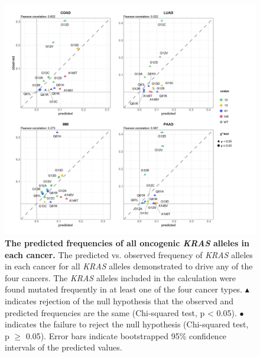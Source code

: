 \documentclass[english, 10pt, letterpaper]{article}
\newcommand{\KRAS}{\emph{KRAS}}
\begin{document}
\begin{figure}[h!]
\centering
\includegraphics[width=180mm]{figures/Supp_Fig_2_mod.jpg}
\caption{
    \textbf{The predicted frequencies of all oncogenic \KRAS{} alleles in each cancer.}
    The predicted vs. observed frequency of \KRAS{} alleles in each cancer for all \KRAS{} alleles demonstrated to drive any of the four cancers. The \KRAS{} alleles included in the calculation were found mutated frequently in at least one of the four cancer types. $\blacktriangle$ indicates rejection of the null hypothesis that the observed and predicted frequencies are the same (Chi-squared test, p < 0.05). $\bullet$ indicates the failure to reject the null hypothesis (Chi-squared test, p $\ge$ 0.05). Error bars indicate bootstrapped 95\% confidence intervals of the predicted values.
}
\label{sfig:obs-vs-pred-supp}
\end{figure}
\newpage
\end{document}
